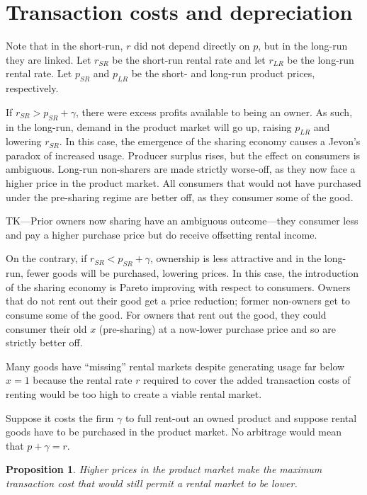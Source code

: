 \documentclass[11pt]{article}
\newtheorem{prop}{Proposition}
\begin{document}
\section{Transaction costs and depreciation}

Note that in the short-run, $r$ did not depend directly on $p$, but in the long-run they are linked. 
Let $r_{SR}$ be the short-run rental rate and let $r_{LR}$ be the long-run rental rate. 
Let $p_{SR}$ and $p_{LR}$ be the short- and long-run product prices, respectively.  

If $r_{SR} > p_{SR} + \gamma$, there were excess profits available to being an owner. 
As such, in the long-run, demand in the product market will go up, raising $p_{LR}$ and lowering $r_{SR}$. 
In this case, the emergence of the sharing economy causes a Jevon's paradox of increased usage. 
Producer surplus rises, but the effect on consumers is ambiguous. 
Long-run non-sharers are made strictly worse-off, as they now face a higher price in the product market. 
All consumers that would not have purchased under the pre-sharing regime are better off, as they consumer some of the good.

TK---Prior owners now sharing have an ambiguous outcome---they consumer less and pay a higher purchase price but do receive offsetting rental income.  

On the contrary, if $r_{SR} < p_{SR} + \gamma$, ownership is less attractive and in the long-run, fewer goods will be purchased, lowering prices. 
In this case, the introduction of the sharing economy is Pareto improving with respect to consumers. 
Owners that do not rent out their good get a price reduction; former non-owners get to consume some of the good. 
For owners that rent out the good, they could consumer their old $x$ (pre-sharing) at a now-lower purchase price and so are strictly better off. 

Many goods have ``missing'' rental markets despite generating usage far below $x = 1$ because the rental rate $r$ required to cover the added transaction costs of renting would be too high to create a viable rental market. 

Suppose it costs the firm $\gamma$ to full rent-out an owned product and suppose rental goods have to be purchased in the product market. 
No arbitrage would mean that $p + \gamma = r$. 

\begin{prop}
Higher prices in the product market make the maximum transaction cost that would still permit a rental market to be lower. 
\end{prop} 
\end{document}
